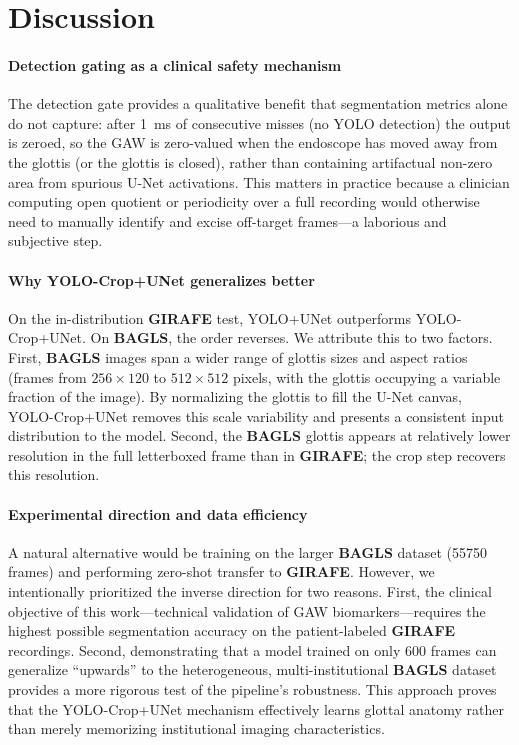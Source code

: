 \documentclass[preprint,12pt]{elsarticle}
\newcommand{\girafe}{\textbf{GIRAFE}}
\newcommand{\bagls}{\textbf{BAGLS}}
\newcommand{\yolounet}{YOLO+UNet}
\newcommand{\yolocrop}{YOLO-Crop+UNet}
\newcommand{\gaw}{GAW}
\begin{document}
\section{Discussion}
\label{sec:discussion}

\paragraph{Detection gating as a clinical safety mechanism}
The detection gate provides a qualitative benefit that segmentation metrics
alone do not capture: after \SI{1}{ms} of consecutive misses (no YOLO detection)
the output is zeroed, so the \gaw{} is zero-valued when the
endoscope has moved away from the glottis (or the glottis is closed), rather
than containing artifactual non-zero area from spurious U-Net activations.
This matters in practice because a clinician computing open quotient or
periodicity over a full recording would otherwise need to manually identify
and excise off-target frames---a laborious and subjective step.

\paragraph{Why \yolocrop{} generalizes better}
On the in-distribution \girafe{} test, \yolounet{} outperforms \yolocrop{}.
On \bagls{}, the order reverses.
We attribute this to two factors.
First, \bagls{} images span a wider range of glottis sizes and aspect ratios
(frames from \(256\times120\) to \(512\times512\) pixels, with the glottis
occupying a variable fraction of the image).
By normalizing the glottis to fill the U-Net canvas, \yolocrop{} removes
this scale variability and presents a consistent input distribution to the
model.
Second, the \bagls{} glottis appears at relatively lower resolution in the
full letterboxed frame than in \girafe{}; the crop step recovers this
resolution.

\paragraph{Experimental direction and data efficiency}
A natural alternative would be training on the larger \bagls{} dataset
(\num{55750} frames) and performing zero-shot transfer to \girafe{}.
However, we intentionally prioritized the inverse direction for two reasons.
First, the clinical objective of this work---technical validation of \gaw{}
biomarkers---requires the highest possible segmentation accuracy on the
patient-labeled \girafe{} recordings.
Second, demonstrating that a model trained on only \num{600} frames can
generalize ``upwards'' to the heterogeneous, multi-institutional \bagls{}
dataset provides a more rigorous test of the pipeline's robustness.
This approach proves that the \yolocrop{} mechanism effectively learns
glottal anatomy rather than merely memorizing institutional imaging
characteristics.
\end{document}
